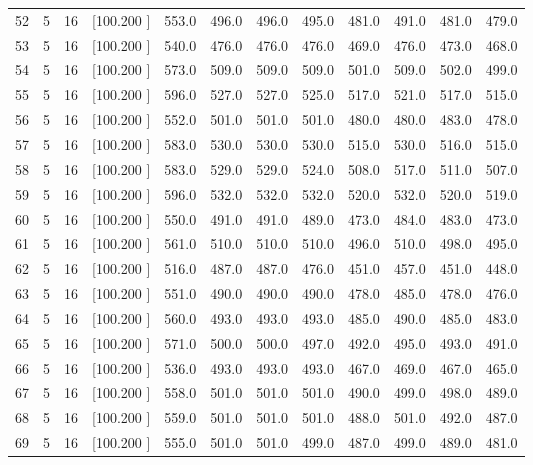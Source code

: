 \documentclass[12pt,a4paper]{article}
\begin{document}
\begin{center}
{\begin{tabular}{r r r r r r r r r r r r}
  52&  5& 16&[100.200   ]&   553.0&   496.0&   496.0&   495.0&   481.0&   491.0&   481.0&   479.0\\[-0.02in]
  53&  5& 16&[100.200   ]&   540.0&   476.0&   476.0&   476.0&   469.0&   476.0&   473.0&   468.0\\[-0.02in]
  54&  5& 16&[100.200   ]&   573.0&   509.0&   509.0&   509.0&   501.0&   509.0&   502.0&   499.0\\[-0.02in]
  55&  5& 16&[100.200   ]&   596.0&   527.0&   527.0&   525.0&   517.0&   521.0&   517.0&   515.0\\[-0.02in]
  56&  5& 16&[100.200   ]&   552.0&   501.0&   501.0&   501.0&   480.0&   480.0&   483.0&   478.0\\[-0.02in]
  57&  5& 16&[100.200   ]&   583.0&   530.0&   530.0&   530.0&   515.0&   530.0&   516.0&   515.0\\[-0.02in]
  58&  5& 16&[100.200   ]&   583.0&   529.0&   529.0&   524.0&   508.0&   517.0&   511.0&   507.0\\[-0.02in]
  59&  5& 16&[100.200   ]&   596.0&   532.0&   532.0&   532.0&   520.0&   532.0&   520.0&   519.0\\[-0.02in]
  60&  5& 16&[100.200   ]&   550.0&   491.0&   491.0&   489.0&   473.0&   484.0&   483.0&   473.0\\[-0.02in]
  61&  5& 16&[100.200   ]&   561.0&   510.0&   510.0&   510.0&   496.0&   510.0&   498.0&   495.0\\[-0.02in]
  62&  5& 16&[100.200   ]&   516.0&   487.0&   487.0&   476.0&   451.0&   457.0&   451.0&   448.0\\[-0.02in]
  63&  5& 16&[100.200   ]&   551.0&   490.0&   490.0&   490.0&   478.0&   485.0&   478.0&   476.0\\[-0.02in]
  64&  5& 16&[100.200   ]&   560.0&   493.0&   493.0&   493.0&   485.0&   490.0&   485.0&   483.0\\[-0.02in]
  65&  5& 16&[100.200   ]&   571.0&   500.0&   500.0&   497.0&   492.0&   495.0&   493.0&   491.0\\[-0.02in]
  66&  5& 16&[100.200   ]&   536.0&   493.0&   493.0&   493.0&   467.0&   469.0&   467.0&   465.0\\[-0.02in]
  67&  5& 16&[100.200   ]&   558.0&   501.0&   501.0&   501.0&   490.0&   499.0&   498.0&   489.0\\[-0.02in]
  68&  5& 16&[100.200   ]&   559.0&   501.0&   501.0&   501.0&   488.0&   501.0&   492.0&   487.0\\[-0.02in]
  69&  5& 16&[100.200   ]&   555.0&   501.0&   501.0&   499.0&   487.0&   499.0&   489.0&   481.0\\[-0.02in]

\end{tabular}}
\end{center}
\end{document}
